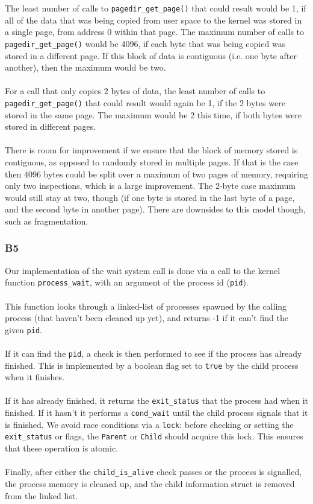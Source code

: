 \documentclass[a4wide, 11pt]{article}
\newcommand{\tx}{\texttt}
\begin{document}
The least number of calls to \tx{pagedir\_get\_page()} that could result would be 1, if all of the data that was being copied from user space to the kernel was stored in a single page, from address 0 within that page. The maximum number of calls to \tx{pagedir\_get\_page()} would be 4096, if each byte that was being copied was stored in a different page. If this block of data is contiguous (i.e. one byte after another), then the maximum would be two.
\\\\
For a call that only copies 2 bytes of data, the least number of calls to \tx{pagedir\_get\_page()} that could result would again be 1, if the 2 bytes were stored in the same page. The maximum would be 2 this time, if both bytes were stored in different pages.
\\\\
There is room for improvement if we ensure that the block of memory stored is contiguous, as opposed to randomly stored in multiple pages. If that is the case then 4096 bytes could be split over a maximum of two pages of memory, requiring only two inspections, which is a large improvement. The 2-byte case maximum would still stay at two, though (if one byte is stored in the last byte of a page, and the second byte in another page). There are downsides to this model though, such as fragmentation.

\subsubsection{B5}


Our implementation of the wait system call is done via a call to the kernel function \texttt{process\_wait}, with an argument of the process id (\texttt{pid}).
\\\\
This function looks through a linked-list of processes spawned by the calling process (that haven't been cleaned up yet), and returns -1 if it can't find the given \texttt{pid}.
\\\\
If it can find the \texttt{pid}, a check is then performed to see if the process has already finished. This is implemented by a boolean flag set to \texttt{true} by the child process when it finishes. \\\\
If it has already finished, it returns the \texttt{exit\_status} that the process had when it finished. If it hasn't it performs a \texttt{cond\_wait} until the child process signals that it is finished. We avoid race conditions via a \texttt{lock}: before checking or setting the \tx{exit\_status} or flags, the \tx{Parent} or \tx{Child} should acquire this lock. This ensures that these operation is atomic.
\\\\
Finally, after either the \texttt{child\_is\_alive} check passes or the process is signalled, the process memory is cleaned up, and the child information struct is removed from the linked list.
\end{document}
